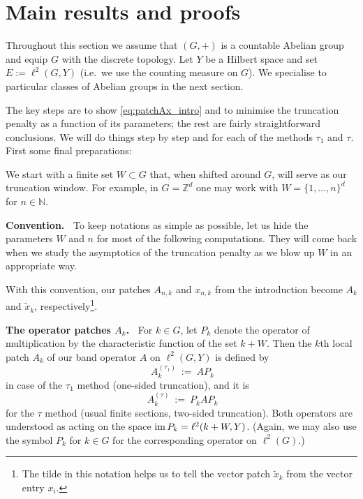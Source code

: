 \documentclass{article}
\newcommand\N{{\mathbb N}}
\newcommand\Z{{\mathbb Z}}
\newcommand\im{{\rm im\,}}
\numberwithin{equation}{section}   %
\numberwithin{figure}{section}  %
\begin{document}
\section{Main results and proofs} \label{sec:main}

Throughout this section we assume that $(G,+)$ is a countable Abelian group and equip $G$ with the discrete topology. Let $Y$ be a Hilbert space and set $E:= \ell^2(G,Y)$ (i.e.\ we use the counting measure on $G$). We specialise to particular classes of Abelian groups in the next section.

The key steps are to show \eqref{eq:patchAx_intro} and to minimise the truncation penalty as a function of its parameters; the rest are fairly straightforward conclusions. We will do things step by step and for each of the methods $\tau_1$ and $\tau$. First some final preparations:

We start with a finite set $W\subset G$ that, when shifted around $G$, will serve as our truncation window. For example, in $G=\Z^d$ one may work with $W=\{1,\dots,n\}^d$ for $n\in\N$. 

\medskip\noindent
{\bf Convention.\ } To keep notations as simple as possible, let us hide the parameters $W$ and $n$ for most of the following computations. They will come back when we study the asymptotics of the truncation penalty as we blow up $W$ in an appropriate way.

With this convention, our patches $A_{n,k}$ and $x_{n,k}$ from the introduction become  $A_k$ and $\tilde x_k$, respectively\footnote{The tilde in this notation helps us to tell the vector patch $\tilde x_k$ from the vector entry $x_i$.}.

\medskip\noindent
{\bf The operator patches $A_k$.\ }
For $k\in G$, let $P_{k}$ denote the operator of multiplication by the characteristic function of the set $k+W$. Then the $k$th local patch $A_k$ of our band operator $A$ on $\ell^2(G,Y)$ is defined by
\begin{equation} \label{eq:patchA_tau1}
\ A_k^{(\tau_1)}\ :=\ AP_k
\end{equation}
in case of the $\tau_1$ method (one-sided truncation), and it is
\begin{equation} \label{eq:patchA_tau}
\ A_k^{(\tau)}\ :=\ P_kAP_k
\end{equation}
for the $\tau$ method (usual finite sections, two-sided truncation). Both operators are understood as acting on the 
space $\im P_k=\ell^2(k+W,Y)$. (Again, we may also use the symbol $P_k$ for $k\in G$ for the corresponding operator on $\ell^2(G)$.)
\end{document}
